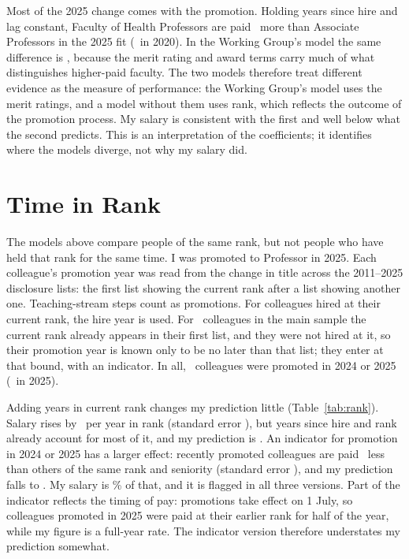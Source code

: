 \documentclass{article}
\begin{document}
Most of the 2025 change comes with the promotion. Holding years since hire and lag constant, Faculty of Health Professors are paid \FTwentyFivePrem\ more than Associate Professors in the 2025 fit (\FTwentyPrem\ in 2020). In the Working Group's model the same difference is \WGPrem, because the merit rating and award terms carry much of what distinguishes higher-paid faculty. The two models therefore treat different evidence as the measure of performance: the Working Group's model uses the merit ratings, and a model without them uses rank, which reflects the outcome of the promotion process. My salary is consistent with the first and well below what the second predicts. This is an interpretation of the coefficients; it identifies where the models diverge, not why my salary did.

\section*{Time in Rank}

The models above compare people of the same rank, but not people who have held that rank for the same time. I was promoted to Professor in 2025. Each colleague's promotion year was read from the change in title across the 2011--2025 disclosure lists: the first list showing the current rank after a list showing another one. Teaching-stream steps count as promotions. For colleagues hired at their current rank, the hire year is used. For \RankCensN\ colleagues in the main sample the current rank already appears in their first list, and they were not hired at it, so their promotion year is known only to be no later than that list; they enter at that bound, with an indicator. In all, \RankRecentN\ colleagues were promoted in 2024 or 2025 (\RankRecentTwentyFiveN\ in 2025).

Adding years in current rank changes my prediction little (Table~\ref{tab:rank}). Salary rises by \RankYearsCoef\ per year in rank (standard error \RankYearsCoefSE), but years since hire and rank already account for most of it, and my prediction is \OnexrankyearsFitted. An indicator for promotion in 2024 or 2025 has a larger effect: recently promoted colleagues are paid \RecentCoefAbs\ less than others of the same rank and seniority (standard error \RecentCoefSE), and my prediction falls to \OnexrecentFitted. My salary is \OnexrecentRatio\% of that, and it is flagged in all three versions. Part of the indicator reflects the timing of pay: promotions take effect on 1 July, so colleagues promoted in 2025 were paid at their earlier rank for half of the year, while my figure is a full-year rate. The indicator version therefore understates my prediction somewhat.
\end{document}
